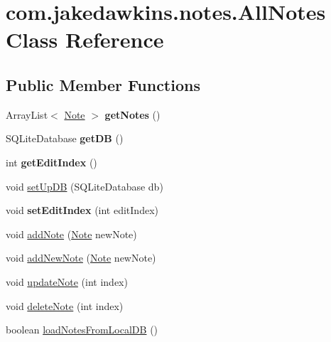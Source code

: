 \hypertarget{classcom_1_1jakedawkins_1_1notes_1_1_all_notes}{}\section{com.\+jakedawkins.\+notes.\+All\+Notes Class Reference}
\label{classcom_1_1jakedawkins_1_1notes_1_1_all_notes}
\subsection*{Public Member Functions}
\begin{DoxyCompactItemize}
\item 
Array\+List$<$ \hyperlink{classcom_1_1jakedawkins_1_1notes_1_1_note}{Note} $>$ {\bfseries get\+Notes} ()\hypertarget{classcom_1_1jakedawkins_1_1notes_1_1_all_notes_a05ecf5ae85a83a06dc79a53164baef33}{}\label{classcom_1_1jakedawkins_1_1notes_1_1_all_notes_a05ecf5ae85a83a06dc79a53164baef33}

\item 
S\+Q\+Lite\+Database {\bfseries get\+DB} ()\hypertarget{classcom_1_1jakedawkins_1_1notes_1_1_all_notes_a65f8d4eb7450a8eb0c40999927247278}{}\label{classcom_1_1jakedawkins_1_1notes_1_1_all_notes_a65f8d4eb7450a8eb0c40999927247278}

\item 
int {\bfseries get\+Edit\+Index} ()\hypertarget{classcom_1_1jakedawkins_1_1notes_1_1_all_notes_af3ed3c2fc66a386f2aa754e042138ba2}{}\label{classcom_1_1jakedawkins_1_1notes_1_1_all_notes_af3ed3c2fc66a386f2aa754e042138ba2}

\item 
void \hyperlink{classcom_1_1jakedawkins_1_1notes_1_1_all_notes_a5d9c47ea94857ade8b12afbbcfb1cf59}{set\+Up\+DB} (S\+Q\+Lite\+Database db)
\item 
void {\bfseries set\+Edit\+Index} (int edit\+Index)\hypertarget{classcom_1_1jakedawkins_1_1notes_1_1_all_notes_a5d72f57021275e9e5e992d14edc705b5}{}\label{classcom_1_1jakedawkins_1_1notes_1_1_all_notes_a5d72f57021275e9e5e992d14edc705b5}

\item 
void \hyperlink{classcom_1_1jakedawkins_1_1notes_1_1_all_notes_af0c95096cc82197830dbdda04341e847}{add\+Note} (\hyperlink{classcom_1_1jakedawkins_1_1notes_1_1_note}{Note} new\+Note)
\item 
void \hyperlink{classcom_1_1jakedawkins_1_1notes_1_1_all_notes_a5b306d331235e918d53ccefa4cabf215}{add\+New\+Note} (\hyperlink{classcom_1_1jakedawkins_1_1notes_1_1_note}{Note} new\+Note)
\item 
void \hyperlink{classcom_1_1jakedawkins_1_1notes_1_1_all_notes_a3eca7407e26aacd8d11caba15c281023}{update\+Note} (int index)
\item 
void \hyperlink{classcom_1_1jakedawkins_1_1notes_1_1_all_notes_adef736c6a1858c7da38f611fea43830b}{delete\+Note} (int index)
\item 
boolean \hyperlink{classcom_1_1jakedawkins_1_1notes_1_1_all_notes_ab55640c37afede82f89707c6074de156}{load\+Notes\+From\+Local\+DB} ()
\end{DoxyCompactItemize}
